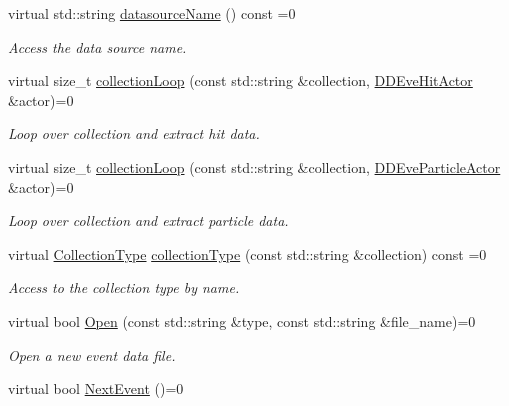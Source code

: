 \begin{DoxyCompactItemize}
virtual std::string \hyperlink{class_d_d4hep_1_1_event_handler_a5fa231363a787ba7edf520b5a99f294e}{datasourceName} () const =0
\begin{DoxyCompactList}\small\item\em Access the data source name. \item\end{DoxyCompactList}\item 
virtual size\_\-t \hyperlink{class_d_d4hep_1_1_event_handler_a454baeb81b675f3ebd8bb4293064b787}{collectionLoop} (const std::string \&collection, \hyperlink{struct_d_d4hep_1_1_d_d_eve_hit_actor}{DDEveHitActor} \&actor)=0
\begin{DoxyCompactList}\small\item\em Loop over collection and extract hit data. \item\end{DoxyCompactList}\item 
virtual size\_\-t \hyperlink{class_d_d4hep_1_1_event_handler_ae43595c2760736a7ca628183a2c91ec2}{collectionLoop} (const std::string \&collection, \hyperlink{struct_d_d4hep_1_1_d_d_eve_particle_actor}{DDEveParticleActor} \&actor)=0
\begin{DoxyCompactList}\small\item\em Loop over collection and extract particle data. \item\end{DoxyCompactList}\item 
virtual \hyperlink{class_d_d4hep_1_1_event_handler_a0b22a141a019364495835317fad48254}{CollectionType} \hyperlink{class_d_d4hep_1_1_event_handler_a8424ffc2056b0e23d69c81ab2496cd51}{collectionType} (const std::string \&collection) const =0
\begin{DoxyCompactList}\small\item\em Access to the collection type by name. \item\end{DoxyCompactList}\item 
virtual bool \hyperlink{class_d_d4hep_1_1_event_handler_a90995d3b610beee9d9f7fafcc060626b}{Open} (const std::string \&type, const std::string \&file\_\-name)=0
\begin{DoxyCompactList}\small\item\em Open a new event data file. \item\end{DoxyCompactList}\item 
virtual bool \hyperlink{class_d_d4hep_1_1_event_handler_ac2360791d3a44f4cef0987f9a7ec51ce}{NextEvent} ()=0

\end{DoxyCompactItemize}
